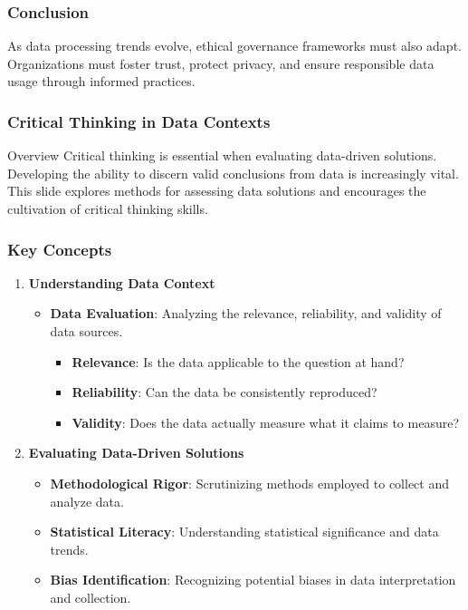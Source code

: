 \documentclass[aspectratio=169]{beamer}
\begin{document}
\begin{frame}[fragile]
    \frametitle{Conclusion}
    As data processing trends evolve, ethical governance frameworks must also adapt. Organizations must foster trust, protect privacy, and ensure responsible data usage through informed practices.
\end{frame}

\begin{frame}[fragile]
    \frametitle{Critical Thinking in Data Contexts}
    \begin{block}{Overview}
        Critical thinking is essential when evaluating data-driven solutions. Developing the ability to discern valid conclusions from data is increasingly vital. This slide explores methods for assessing data solutions and encourages the cultivation of critical thinking skills.
    \end{block}
\end{frame}

\begin{frame}[fragile]
    \frametitle{Key Concepts}
    \begin{enumerate}
        \item \textbf{Understanding Data Context}
        \begin{itemize}
            \item \textbf{Data Evaluation}: Analyzing the relevance, reliability, and validity of data sources.
            \begin{itemize}
                \item \textbf{Relevance}: Is the data applicable to the question at hand?
                \item \textbf{Reliability}: Can the data be consistently reproduced?
                \item \textbf{Validity}: Does the data actually measure what it claims to measure?
            \end{itemize}
        \end{itemize}
        
        \item \textbf{Evaluating Data-Driven Solutions}
        \begin{itemize}
            \item \textbf{Methodological Rigor}: Scrutinizing methods employed to collect and analyze data.
            \item \textbf{Statistical Literacy}: Understanding statistical significance and data trends.
            \item \textbf{Bias Identification}: Recognizing potential biases in data interpretation and collection.
        \end{itemize}
    \end{enumerate}
\end{frame}
\end{document}
